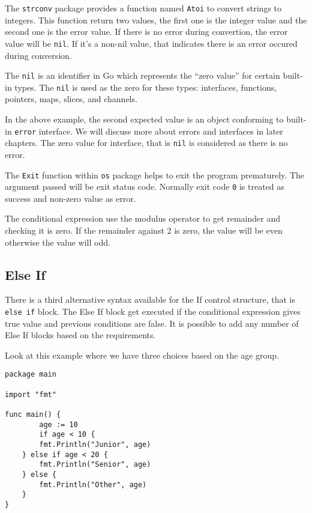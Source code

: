 The \texttt{strconv} package provides a function named \texttt{Atoi}
to convert strings to integers.  This function return two values, the
first one is the integer value and the second one is the error value.
If there is no error during convertion, the error value will
be \texttt{nil}.  If it's a non-nil value, that indicates there is an
error occured during conversion.

The \texttt{nil} is an identifier in Go which represents the ``zero
value'' for certain built-in types.  The \texttt{nil} is used as the
zero for these types: interfaces, functions, pointers, maps, slices,
and channels.

In the above example, the second expected value is an object
conforming to built-in \texttt{error} interface.  We will discuss more
about errors and interfaces in later chapters.  The zero value for
interface, that is \texttt{nil} is considered as there is no error.

The \texttt{Exit} function within \texttt{os} package helps to exit
the program prematurely.  The argument passed will be exit status
code.  Normally exit code \texttt{0} is treated as success and
non-zero value as error.

The conditional expression use the modulus operator to get remainder
and checking it is zero.  If the remainder against 2 is zero, the
value will be even otherwise the value will odd.

\subsection{Else If}

There is a third alternative syntax available for the If control
structure, that is \texttt{else if} block.  The Else If block get
executed if the conditional expression gives true value and previous
conditions are false.  It is possible to add any number of Else If
blocks based on the requirements.

Look at this example where we have three choices based on the age
group.

\begin{lstlisting}[caption=if example program output]
package main

import "fmt"

func main() {
        age := 10
        if age < 10 {
        fmt.Println("Junior", age)
    } else if age < 20 {
        fmt.Println("Senior", age)
    } else {
        fmt.Println("Other", age)
    }
}
\end{lstlisting}

